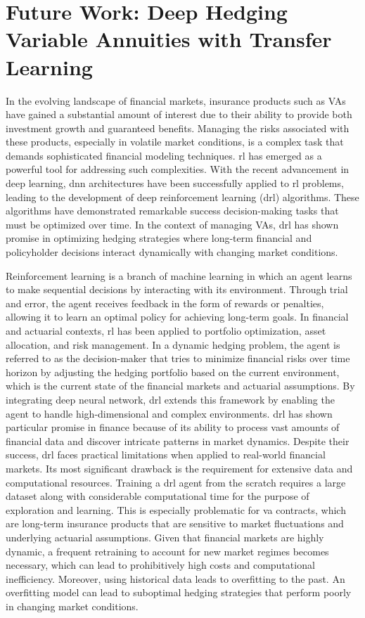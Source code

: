 \chapter{Future Work: Deep Hedging Variable Annuities with Transfer Learning} \label{chap:futureWork}

In the evolving landscape of financial markets, insurance products such as VAs have gained a substantial amount of interest due to their ability to provide both investment growth and guaranteed benefits. 
Managing the risks associated with these products, especially in volatile market conditions, is a complex task that demands sophisticated financial modeling techniques. 
\gls{rl} has emerged as a powerful tool for addressing such complexities. With the recent advancement in deep learning, \gls{dnn} architectures have been successfully applied to \gls{rl} problems, leading to the development of deep reinforcement learning (\gls{drl}) algorithms. 
These algorithms have demonstrated remarkable success decision-making tasks that must be optimized over time. 
In the context of managing VAs, \gls{drl} has shown promise in optimizing hedging strategies where long-term financial and policyholder decisions interact dynamically with changing market conditions.

Reinforcement learning is a branch of machine learning in which an agent learns to make sequential decisions by interacting with its environment. 
Through trial and error, the agent receives feedback in the form of rewards or penalties, allowing it to learn an optimal policy for achieving long-term goals. 
In financial and actuarial contexts, \gls{rl} has been applied to portfolio optimization, asset allocation, and risk management. 
In a dynamic hedging problem, the agent is referred to as the decision-maker that tries to minimize financial risks over time horizon by adjusting the hedging portfolio based on the current environment, which is the current state of the financial markets and actuarial assumptions.
By integrating deep neural network, \gls{drl} extends this framework by enabling the agent to handle high-dimensional and complex environments. 
\gls{drl} has shown particular promise in finance because of its ability to process vast amounts of financial data and discover intricate patterns in market dynamics.
Despite their success, \gls{drl} faces practical limitations when applied to real-world financial markets.
Its most significant drawback is the requirement for extensive data and computational resources.
Training a \gls{drl} agent from the scratch requires a large dataset along with considerable computational time for the purpose of exploration and learning.
This is especially problematic for \gls{va} contracts, which are long-term insurance products that are sensitive to market fluctuations and underlying actuarial assumptions.
Given that financial markets are highly dynamic, a frequent retraining to account for new market regimes becomes necessary, which can lead to prohibitively high costs and computational inefficiency.
Moreover, using historical data leads to overfitting to the past. 
An overfitting model can lead to suboptimal hedging strategies that perform poorly in changing market conditions.

